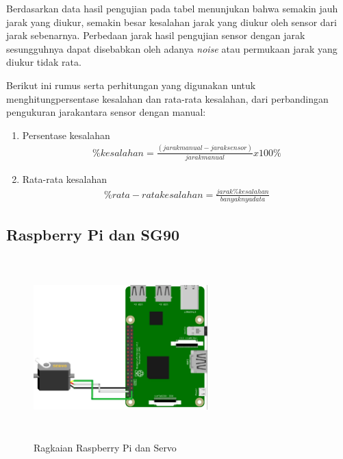 Berdasarkan data hasil pengujian pada tabel menunjukan bahwa semakin jauh jarak yang diukur, semakin besar kesalahan jarak yang diukur oleh sensor dari jarak sebenarnya. Perbedaan jarak hasil pengujian sensor dengan jarak sesungguhnya dapat disebabkan oleh adanya \textit{noise} atau permukaan jarak yang diukur tidak rata.

Berikut ini rumus serta perhitungan yang digunakan untuk menghitungpersentase kesalahan dan rata-rata kesalahan, dari perbandingan pengukuran jarakantara sensor dengan manual:

\begin{enumerate}[topsep=0pt,itemsep=0pt,partopsep=0pt, parsep=0pt]
    \item Persentase kesalahan
    \begin{equation}
        \label{eq:persentase-kesalahan}
        \begin{split}
        \%kesalahan = \frac{(jarak manual - jarak sensor)}{jarak manual} x 100\%
        \end{split}
    \end{equation}

    \item Rata-rata kesalahan
    \begin{equation}
        \label{eq:persentase-kesalahan}
        \begin{split}
        \%rata-rata kesalahan = \frac{jarak \% kesalahan}{banyaknya data} 
        \end{split}
    \end{equation}
\end{enumerate}

\subsection{Raspberry Pi dan SG90}
\begin{figure} [H]
    \includegraphics[height=7cm, width=0.6\textwidth, center]{images/skematik_servo.jpg}
    \caption{Ragkaian Raspberry Pi dan Servo}
    \label{fig:skematikServo}
\end{figure}

